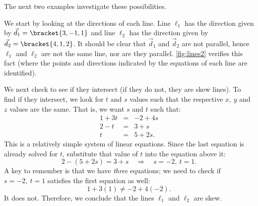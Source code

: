The next two examples investigate these possibilities.

{We start by looking at the directions of each line. Line $\ell_1$ has the direction given by $\vec d_1=\bracket{3,-1,1}$ and line $\ell_2$ has the direction given by $\vec d_2 =\bracket{4,1,2}$. It should be clear that $\vec d_1$ and $\vec d_2$ are not parallel, hence $\ell_1$ and $\ell_2$ are not the same line, nor are they parallel. \autoref{fig:lines2} verifies this fact (where the points and directions indicated by the equations of each line are identified).


We next check to see if they intersect (if they do not, they are skew lines). To find if they intersect, we look for $t$ and $s$ values such that the respective $x$, $y$ and $z$ values are the same. That is, we want $s$ and $t$ such that:
\[
\begin{array}{ccc}
1+3t &=&-2+4s\\
2-t&=&3+s\\
t&=&5+2s.\end{array}
\]
This is a relatively simple system of linear equations. Since the last equation is already solved for $t$, substitute that value of $t$ into the equation above it:
\[2-(5+2s) = 3+s \quad \Rightarrow \quad s=-2,\ t=1.\]
A key to remember is that we have \emph{three} equations; we need to check if $s=-2,\ t=1$ satisfies the first equation as well:
\[1+3(1) \neq -2+4(-2).\]
It does not. Therefore, we conclude that the lines $\ell_1$ and $\ell_2$ are skew.}

